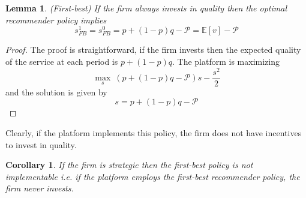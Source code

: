 \documentclass[a4paper]{article}
\newcommand{\expect}{\mathbb{E}}
\newtheorem{corollary}{Corollary}[theorem]
\newtheorem{lemma}[theorem]{Lemma}
\begin{document}
\begin{lemma}(First-best)
	If the firm always invests in quality then the optimal recommender policy implies $$s^1_{FB} = s^0_{FB} = p + (1-p)q - \mathcal{P} = \expect[v] - \mathcal{P}$$
\end{lemma}
\begin{proof}
	The proof is straightforward, if the firm invests then the expected quality of the service at each period is $p+(1-p)q$. The platform is maximizing $$\underset{s}{\max}\ (p+(1-p)q - \mathcal{P})s - \frac{s^2}{2}$$ and the solution is given by $$s = p + (1-p)q - \mathcal{P}$$
\end{proof}
Clearly, if the platform implements this policy, the firm does not have incentives to invest in quality. 
\begin{corollary}
	If the firm is strategic then the first-best policy is not implementable i.e. if the platform employs the first-best recommender policy, the firm never invests.
\end{corollary}
\end{document}
